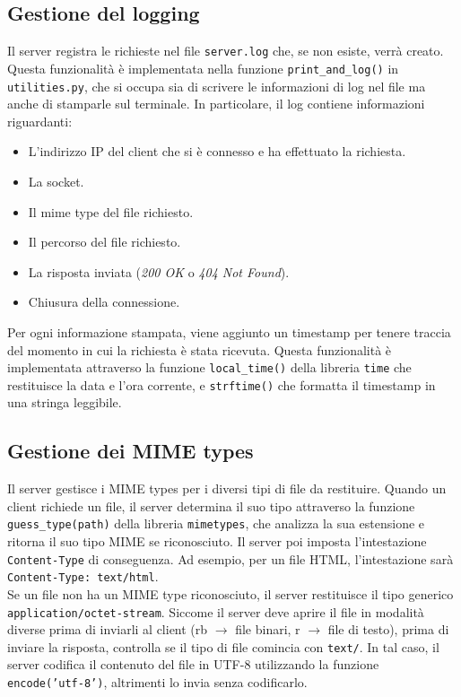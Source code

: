 \documentclass[a4paper,12pt]{report}
\begin{document}
\subsection{Gestione del logging}
\label{sec:gestione-logging}
Il server registra le richieste nel file \texttt{server.log} che, se non esiste, verrà creato. Questa funzionalità è implementata nella funzione \texttt{print\_and\_log()} in \texttt{utilities.py}, che si occupa sia di scrivere le informazioni di log nel file ma anche di stamparle sul terminale.
In particolare, il log contiene informazioni riguardanti:
\begin{itemize}
    \item L'indirizzo IP del client che si è connesso e ha effettuato la richiesta.
    \item La socket.
    \item Il mime type del file richiesto.
    \item Il percorso del file richiesto.
    \item La risposta inviata (\textit{200 OK} o \textit{404 Not Found}).
    \item Chiusura della connessione.
\end{itemize}
Per ogni informazione stampata, viene aggiunto un timestamp per tenere traccia del momento in cui la richiesta è stata ricevuta. Questa funzionalità è implementata attraverso la funzione \texttt{local\_time()} della libreria \texttt{time} che restituisce la data e l'ora corrente, e \texttt{strftime()} che formatta il timestamp in una stringa leggibile.

\subsection{Gestione dei MIME types}
\label{sec:mime-types}
Il server gestisce i MIME types per i diversi tipi di file da restituire. Quando un client richiede un file, il server determina il suo tipo attraverso la funzione \texttt{guess\_type(path)} della libreria \texttt{mimetypes}, che analizza la sua estensione e ritorna il suo tipo MIME se riconosciuto. Il server poi imposta l'intestazione \texttt{Content-Type} di conseguenza. Ad esempio, per un file HTML, l'intestazione sarà \texttt{Content-Type: text/html}. \\ Se un file non ha un MIME type riconosciuto, il server restituisce il tipo generico \texttt{application/octet-stream}.
Siccome il server deve aprire il file in modalità diverse prima di inviarli al client (rb $\rightarrow$ file binari, r $\rightarrow$ file di testo), prima di inviare la risposta, controlla se il tipo di file comincia con \texttt{text/}. In tal caso, il server codifica il contenuto del file in UTF-8 utilizzando la funzione \texttt{encode('utf-8')}, altrimenti lo invia senza codificarlo.
\end{document}

